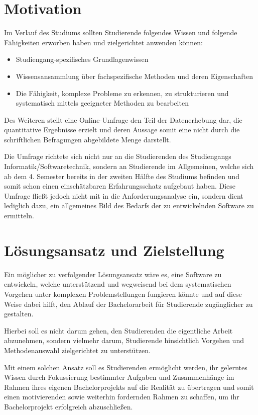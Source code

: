 \documentclass[bibliography=totoc,listof=totoc,BCOR=5mm,DIV=12,oneside]{scrbook}
\begin{document}
\section{Motivation}
\par Im Verlauf des Studiums sollten Studierende folgendes Wissen und folgende Fähigkeiten erworben haben und zielgerichtet anwenden können:
\begin{itemize}
\item Studiengang-spezifisches Grundlagenwissen
\item Wissensansammlung über fachspezifische Methoden und deren Eigenschaften
\item Die Fähigkeit, komplexe Probleme zu erkennen, zu strukturieren und systematisch mittels geeigneter Methoden zu bearbeiten
\end{itemize}

\par \bigskip Des Weiteren stellt eine Online-Umfrage den Teil der Datenerhebung dar, die quantitative Ergebnisse erzielt und deren Aussage somit eine nicht durch die schriftlichen Befragungen abgebildete Menge darstellt.
\par Die Umfrage richtete sich nicht nur an die Studierenden des Studiengangs Informatik/Softwaretechnik, sondern an Studierende im Allgemeinen, welche sich ab dem 4. Semester bereits in der zweiten Hälfte des Studiums befinden und somit schon einen einschätzbaren Erfahrungsschatz aufgebaut haben. Diese Umfrage fließt jedoch nicht mit in die Anforderungsanalyse ein, sondern dient lediglich dazu, ein allgemeines Bild des Bedarfs der zu entwickelnden Software zu ermitteln.

\newpage
\section{Lösungsansatz und Zielstellung}
\par Ein möglicher zu verfolgender Lösungsansatz wäre es, eine Software zu entwickeln, welche unterstützend und wegweisend bei dem systematischen Vorgehen unter komplexen Problemstellungen fungieren könnte und auf diese Weise dabei hilft, den Ablauf der Bachelorarbeit für Studierende zugänglicher zu gestalten.
\par Hierbei soll es nicht darum gehen, den Studierenden die eigentliche Arbeit abzunehmen, sondern vielmehr darum, Studierende hinsichtlich Vorgehen und Methodenauswahl zielgerichtet zu unterstützen.

\par \bigskip Mit einem solchen Ansatz soll es Studierenden ermöglicht werden, ihr gelerntes Wissen durch Fokussierung bestimmter Aufgaben und Zusammenhänge im Rahmen ihres eigenen Bachelorprojekts auf die Realität zu übertragen und somit einen motivierenden sowie weiterhin fordernden Rahmen zu schaffen, um ihr Bachelorprojekt erfolgreich abzuschließen.
\end{document}
